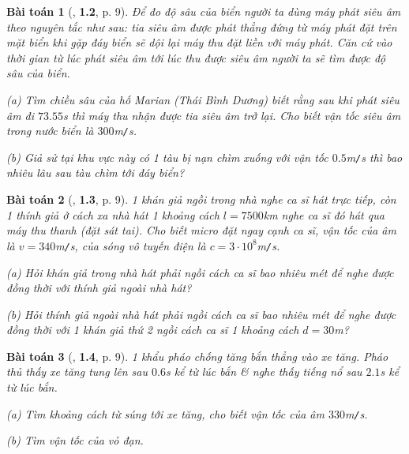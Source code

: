 \documentclass{article}
\numberwithin{equation}{section}
\newtheorem{baitoan}{Bài toán}[section]
\begin{document}
\begin{baitoan}[\cite{Van2022}, \textbf{1.2}, p. 9]
	Để đo độ sâu của biển người ta dùng máy phát siêu âm theo nguyên tắc như sau: tia siêu âm được phát thẳng đứng từ máy phát đặt trên mặt biển khi gặp đáy biển sẽ dội lại máy thu đặt liền với máy phát. Căn cứ vào thời gian từ lúc phát siêu âm tới lúc thu được siêu âm người ta sẽ tìm được độ sâu của biển.
	\begin{enumerate*}
		\item[(a)] Tìm chiều sâu của hố Marian (Thái Bình Dương) biết rằng sau khi phát siêu âm đi $73.55$\emph{s} thì máy thu nhận được tia siêu âm trở lại. Cho biết vận tốc siêu âm trong nước biển là $300$\emph{m\texttt{/}s}.
		\item[(b)] Giả sử tại khu vực này có 1 tàu bị nạn chìm xuống với vận tốc $0.5$\emph{m\texttt{/}s} thì bao nhiêu lâu sau tàu chìm tới đáy biển?
	\end{enumerate*}
\end{baitoan}

\begin{baitoan}[\cite{Van2022}, \textbf{1.3}, p. 9]
	1 khán giả ngồi trong nhà nghe ca sĩ hát trực tiếp, còn 1 thính giả ở cách xa nhà hát 1 khoảng cách $l = 7500$\emph{km} nghe ca sĩ đó hát qua máy thu thanh (đặt sát tai). Cho biết micro đặt ngay cạnh ca sĩ, vận tốc của âm là $v = 340$\emph{m\texttt{/}s}, của sóng vô tuyến điện là $c = 3\cdot 10^8$\emph{m\texttt{/}s}.
	\begin{enumerate*}
		\item[(a)] Hỏi khán giả trong nhà hát phải ngồi cách ca sĩ bao nhiêu mét để nghe được đồng thời với thính giả ngoài nhà hát?
		\item[(b)] Hỏi thính giả ngoài nhà hát phải ngồi cách ca sĩ bao nhiêu mét để nghe được đồng thời với 1 khán giả thứ 2 ngồi cách ca sĩ 1 khoảng cách $d = 30$\emph{m}?
	\end{enumerate*}
\end{baitoan}

\begin{baitoan}[\cite{Van2022}, \textbf{1.4}, p. 9]
	1 khẩu pháo chống tăng bắn thẳng vào xe tăng. Pháo thủ thấy xe tăng tung lên sau $0.6$\emph{s} kể từ lúc bắn \& nghe thấy tiếng nổ sau $2.1$\emph{s} kể từ lúc bắn.
	\begin{enumerate*}
		\item[(a)] Tìm khoảng cách từ súng tới xe tăng, cho biết vận tốc của âm $330$\emph{m\texttt{/}s}.
		\item[(b)] Tìm vận tốc của vỏ đạn.
	\end{enumerate*}
\end{baitoan}
\end{document}
